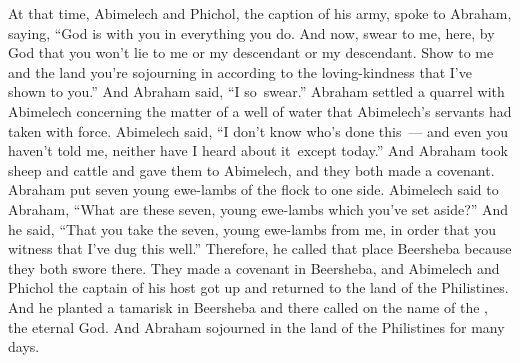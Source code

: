 \begin{inparaenum}
   At that time, Abimelech and Phichol, the caption of his army, spoke to Abraham, saying, ``God is with you in everything you do.%
   And now, swear to me, here, by God that you won't lie to me or my descendant or my descendant. Show to me and the land you're sojourning in according to the loving-kindness that I've shown to you.''%
   And Abraham said, ``I so\understood\ swear.''%
   Abraham settled a quarrel with Abimelech concerning the matter of a well of water that Abimelech's servants had taken with force.%
   Abimelech said, ``I don't know who's done this~--- and even you haven't told me, neither have I heard {about it}\understood\ except today.''%
   And Abraham took sheep and cattle and gave them to Abimelech, and they both made a covenant.%
   Abraham put seven young ewe-lambs of the flock to one side.%
   Abimelech said to Abraham, ``What are these seven, young ewe-lambs which you've set aside?''%
   And he said, ``That you take the seven, young ewe-lambs from me, in order that you witness that I've dug this well.''%
   Therefore, he called that place Beersheba because they both swore there.%
   They made a covenant in Beersheba, and Abimelech and Phichol the captain of his host got up and returned to the land of the Philistines.%
   And he planted a tamarisk in Beersheba and there called on the name of the \lord, the eternal God.%
   And Abraham sojourned in the land of the Philistines for many days.%
\end{inparaenum}
